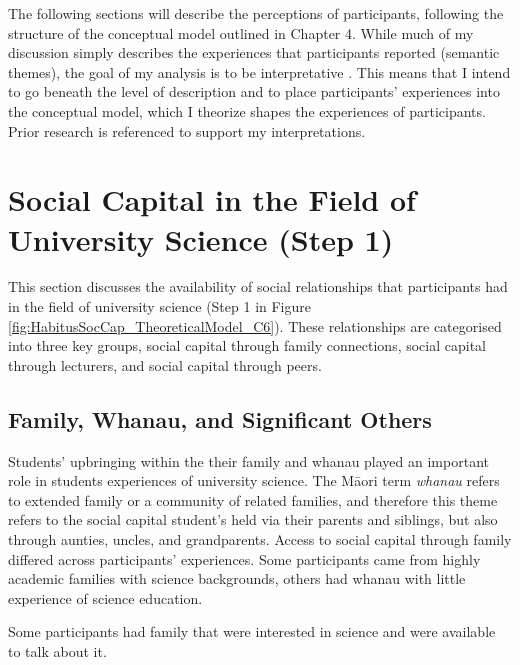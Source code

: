The following sections will describe the perceptions of participants, following the structure of the conceptual model outlined in Chapter 4. While much of my discussion simply describes the experiences that participants reported (semantic themes), the goal of my analysis is to be interpretative \citep{Braun_2006}. This means that I intend to go beneath the level of description and to place participants' experiences into the conceptual model, which I theorize shapes the experiences of participants. Prior research is referenced to support my interpretations. 

\section{Social Capital in the Field of University Science (Step 1)}
This section discusses the availability of social relationships that participants had in the field of university science (Step 1 in Figure \ref{fig:HabitusSocCap_TheoreticalModel_C6}). These relationships are categorised into three key groups, social capital through family connections, social capital through lecturers, and social capital through peers. 

\subsection{Family, Whanau, and Significant Others}
Students' upbringing within the their family and whanau played an important role in students experiences of university science. The M\={a}ori term \textit{whanau} refers to extended family or a community of related families, and therefore this theme refers to the social capital student's held via their parents and siblings, but also through aunties, uncles, and grandparents. Access to social capital through family differed across participants' experiences. Some participants came from highly academic families with science backgrounds, others had whanau with little experience of science education.

Some participants had family that were interested in science and were available to  talk about it. 

